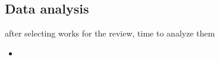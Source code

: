 \subsection{Data analysis}\label{subsec:data-analysis}


after selecting works for the review, time to analyze them

\begin{itemize}
    \item
\end{itemize}


